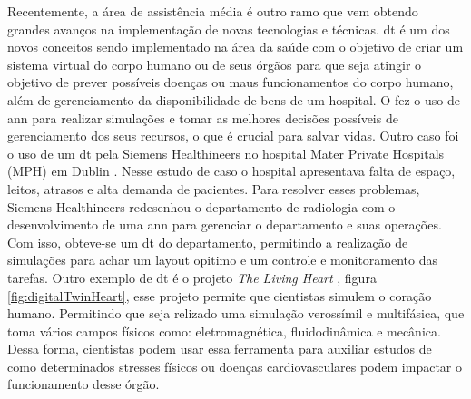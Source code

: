Recentemente, a área de assistência média  é outro ramo que vem obtendo grandes avanços na implementação de novas tecnologias e técnicas. \acrlong{dt} é um dos novos conceitos sendo implementado na área da saúde com o objetivo de criar um sistema virtual do corpo humano ou de seus órgãos  para que seja  atingir o objetivo de prever possíveis doenças ou maus funcionamentos do corpo humano, além de gerenciamento da disponibilidade de bens de um hospital. O  \textcite{johns_2016} fez o uso de \acrshort{ann} para realizar simulações e tomar as melhores decisões possíveis de gerenciamento dos seus recursos, o que é crucial para salvar vidas. Outro caso foi o uso de um \acrshort{dt} pela Siemens Healthineers no hospital Mater Private Hospitals (MPH) em Dublin \cite{gilligan_digital_2018}. Nesse estudo de caso o hospital apresentava falta de espaço, leitos, atrasos e alta demanda de pacientes. Para resolver esses problemas, Siemens Healthineers redesenhou o departamento de radiologia com o desenvolvimento de uma \acrshort{ann} para gerenciar o departamento e suas operações. Com isso, obteve-se um \acrshort{dt} do departamento, permitindo a realização de simulações para achar um layout opitimo e um controle e monitoramento das tarefas. Outro exemplo de \acrfull{dt} é o projeto \emph{The Living Heart} \cite{Levine2022}, figura \ref{fig:digitalTwinHeart}, esse projeto permite que cientistas simulem o coração humano. Permitindo que seja relizado uma simulação verossímil e multifásica, que toma  vários campos físicos como: eletromagnética, fluidodinâmica e mecânica. Dessa forma, cientistas podem usar essa ferramenta para auxiliar estudos de como determinados stresses físicos ou doenças cardiovasculares podem impactar o funcionamento desse órgão. 

